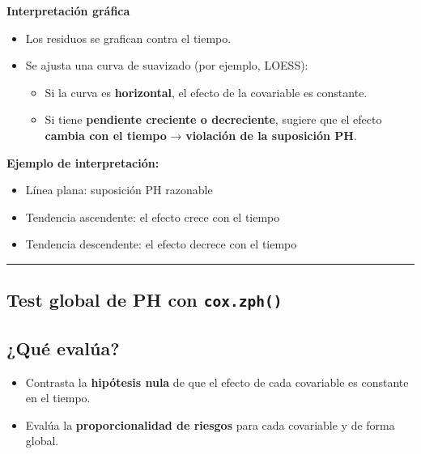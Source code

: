 \documentclass[
]{article}
\providecommand{\tightlist}{%
  \setlength{\itemsep}{0pt}\setlength{\parskip}{0pt}}
\begin{document}
\textbf{Interpretación gráfica}

\begin{itemize}
\tightlist
\item
  Los residuos se grafican contra el tiempo.
\item
  Se ajusta una curva de suavizado (por ejemplo, LOESS):

  \begin{itemize}
  \tightlist
  \item
    Si la curva es \textbf{horizontal}, el efecto de la covariable es
    constante.
  \item
    Si tiene \textbf{pendiente creciente o decreciente}, sugiere que el
    efecto \textbf{cambia con el tiempo} → \textbf{violación de la
    suposición PH}.
  \end{itemize}
\end{itemize}

\textbf{Ejemplo de interpretación:}

\begin{itemize}
\tightlist
\item
  Línea plana: suposición PH razonable
\item
  Tendencia ascendente: el efecto crece con el tiempo
\item
  Tendencia descendente: el efecto decrece con el tiempo
\end{itemize}

\begin{center}\rule{0.5\linewidth}{0.5pt}\end{center}

\subsection{\texorpdfstring{Test global de PH con
\texttt{cox.zph()}}{Test global de PH con cox.zph()}}\label{test-global-de-ph-con-cox.zph}

\subsection{¿Qué evalúa?}\label{quuxe9-evaluxfaa}

\begin{itemize}
\tightlist
\item
  Contrasta la \textbf{hipótesis nula} de que el efecto de cada
  covariable es constante en el tiempo.
\item
  Evalúa la \textbf{proporcionalidad de riesgos} para cada covariable y
  de forma global.
\end{itemize}
\end{document}
